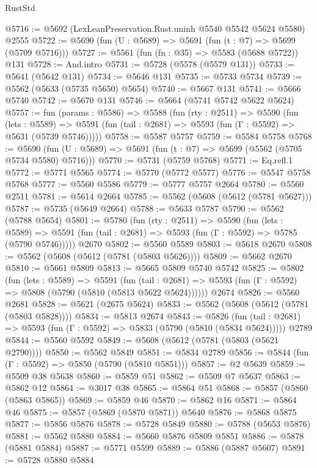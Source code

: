 \begin{lexlean}{RustStd}
\begin{coremodule}
@5716 := @5692 (LexLeanPreservation.Rust.uninh @5540 @5542 @5624 @5580) @2555
@5722 := @5690 (fun (U : @5689) => @5691 (fun (t : @7) => @5699 (@5709 @5716)))
@5727 := @5561 (fun (fn : @35) => @5583 (@5688 @5722)) @131
@5728 := And.intro
@5731 := @5728 (@5578 (@5579 @131))
@5733 := @5641 (@5642 @131)
@5734 := @5646 @131
@5735 := @5733 @5734
@5739 := @5562 (@5633 (@5735 @5650) @5654)
@5740 := @5667 @131
@5741 := @5666 @5740
@5742 := @5670 @131
@5746 := @5664 (@5741 @5742 @5622 @5624)
@5757 := fun (params : @5586) =>
  @5588
    (fun (rty : @2511) =>
    @5590
      (fun (lets : @5589) =>
      @5591 (fun (tail : @2681) => @5593 (fun (Γ : @5592) => @5631 (@5739 @5746)))))
@5758 := @5587 @5757
@5759 := @5584 @5758
@5768 := @5690 (fun (U : @5689) => @5691 (fun (t : @7) => @5699 (@5562 (@5705 @5734 @5580) @5716)))
@5770 := @5731 (@5759 @5768)
@5771 := Eq.refl.{1}
@5772 := @5771 @5565
@5774 := @5770 (@5772 @5577)
@5776 := @5547 @5758 @5768
@5777 := @5560 @5586
@5779 := @5777 @5757 @2664
@5780 := @5560 @2511
@5781 := @5614 @2664
@5785 := @5562 (@5608 (@5612 (@5781 @5627)))
@5787 := @5735 (@5649 @2664)
@5788 := @5633 @5787
@5790 := @5562 (@5788 @5654)
@5801 := @5780
    (fun (rty : @2511) =>
    @5590
      (fun (lets : @5589) =>
      @5591 (fun (tail : @2681) => @5593 (fun (Γ : @5592) => @5785 (@5790 @5746)))))
    @2670
@5802 := @5560 @5589
@5803 := @5618 @2670
@5808 := @5562 (@5608 (@5612 (@5781 (@5803 @5626))))
@5809 := @5662 @2670
@5810 := @5661 @5809
@5813 := @5665 @5809 @5740 @5742
@5825 := @5802
    (fun (lets : @5589) =>
    @5591
      (fun (tail : @2681) => @5593 (fun (Γ : @5592) => @5808 (@5790 (@5810 (@5813 @5622 @5624))))))
    @2674
@5826 := @5560 @2681
@5828 := @5621 (@2675 @5624)
@5833 := @5562 (@5608 (@5612 (@5781 (@5803 @5828))))
@5834 := @5813 @2674
@5843 := @5826
    (fun (tail : @2681) => @5593 (fun (Γ : @5592) => @5833 (@5790 (@5810 (@5834 @5624)))))
    @2789
@5844 := @5560 @5592
@5849 := @5608 (@5612 (@5781 (@5803 (@5621 @2790))))
@5850 := @5562 @5849
@5851 := @5834 @2789
@5856 := @5844 (fun (Γ : @5592) => @5850 (@5790 (@5810 @5851)))
@5857 := @2 @5639
@5859 := @5509 @38 @5638
@5860 := @5859 @51
@5862 := @5509 @7 @5637
@5863 := @5862 @12
@5864 := @3017 @38
@5865 := @5864 @51
@5868 := @5857 (@5860 (@5863 @5865))
@5869 := @5859 @46
@5870 := @5862 @16
@5871 := @5864 @46
@5875 := @5857 (@5869 (@5870 @5871)) @5640
@5876 := @5868 @5875
@5877 := @5856 @5876
@5878 := @5728 @5849
@5880 := @5788 (@5653 @5876)
@5881 := @5562 @5880
@5884 := @5660 @5876 @5809 @5851
@5886 := @5878 (@5881 @5884)
@5887 := @5771 @5599
@5889 := @5886 (@5887 @5607)
@5891 := @5728 @5880 @5884

\end{coremodule}
\end{lexlean}
